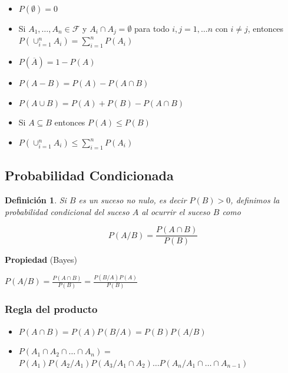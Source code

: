 \documentclass[12pt]{report}
\newtheorem{definition}{Definici\'on}
\begin{document}
             \begin{itemize}
             \item $P(\emptyset)=0$
             \item Si $A_{1},\ldots,A_{n}\in \mathcal{F}$ y $A_{i}\cap
             A_{j}=\emptyset$ para todo $i,j=1,\ldots n $ con $i\not=j$,
              entonces \newline
              $\displaystyle P(\cup_{i=1}^{n}A_{i})= \sum_{i=1}^{n} P(A_{i})$
                 \item  $P(\overline{A})=1-P(A)$
             \item $P(A-B)=P(A)-P(A\cap B)$
             \item $P(A\cup B)=P(A)+P(B)-P(A\cap B)$
             \item Si $ A\subseteq B$ entonces $P(A)\leq P(B)$
             \item $\displaystyle P(\cup_{i=1}^{n}A_{i})\leq
             \sum_{i=1}^{n} P(A_{i})$
        \end{itemize}



        \subsection{Probabilidad Condicionada}

        \begin{definition}
        Si $B$ es un suceso no nulo, es decir $P(B)>0$, definimos la
        probabilidad condicional del suceso $A$ al ocurrir el suceso
           $B$ como

        $$P(A/B)=\frac{P(A\cap B)}{P(B)}$$
\end{definition}

        \textbf{Propiedad} (Bayes)

        $P(A/B)=\frac{P(A\cap B)}{P(B)}=\frac{P(B/A) P(A)}{P(B)}$

    \subsubsection{Regla del producto}
        \begin{itemize}
            \item $P(A\cap B)=P(A) P(B/A)=P(B) P(A/B)$
            \item $P(A_{1}\cap A_{2}\cap\ldots\cap A_{n})=$\newline
            $P(A_{1})
            P(A_{2}/A_{1}) P(A_{3}/A_{1}\cap A_{2})\ldots P(A_{n}/A_{1}\cap
            \ldots\cap A_{n-1})$
         \end{itemize}
\end{document}
